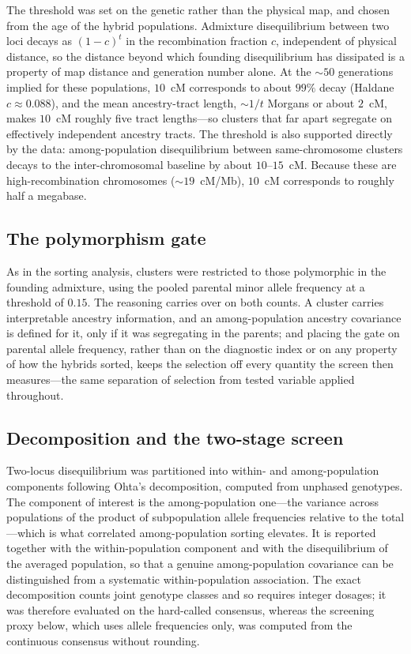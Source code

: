 \documentclass[11pt]{article}
\begin{document}
The threshold was set on the genetic rather than the physical map, and chosen from
the age of the hybrid populations. Admixture disequilibrium between two loci decays
as $(1-c)^{t}$ in the recombination fraction $c$, independent of physical distance,
so the distance beyond which founding disequilibrium has dissipated is a property of
map distance and generation number alone. At the $\sim\!50$ generations implied for
these populations, $10$~cM corresponds to about $99\%$ decay (Haldane $c \approx
0.088$), and the mean ancestry-tract length, $\sim\!1/t$ Morgans or about $2$~cM,
makes $10$~cM roughly five tract lengths---so clusters that far apart segregate on
effectively independent ancestry tracts. The threshold is also supported directly by
the data: among-population disequilibrium between same-chromosome clusters decays to
the inter-chromosomal baseline by about $10$--$15$~cM. Because these are
high-recombination chromosomes ($\sim\!19$~cM/Mb), $10$~cM corresponds to roughly
half a megabase.

\subsection{The polymorphism gate}
As in the sorting analysis, clusters were restricted to those polymorphic in the
founding admixture, using the pooled parental minor allele frequency at a threshold
of $0.15$. The reasoning carries over on both counts. A cluster carries
interpretable ancestry information, and an among-population ancestry covariance is
defined for it, only if it was segregating in the parents; and placing the gate on
parental allele frequency, rather than on the diagnostic index or on any property
of how the hybrids sorted, keeps the selection off every quantity the screen then
measures---the same separation of selection from tested variable applied throughout.

\subsection{Decomposition and the two-stage screen}
Two-locus disequilibrium was partitioned into within- and among-population
components following Ohta's decomposition, computed from unphased genotypes. The
component of interest is the among-population one---the variance across populations
of the product of subpopulation allele frequencies relative to the total---which is
what correlated among-population sorting elevates. It is reported together with the
within-population component and with the disequilibrium of the averaged population,
so that a genuine among-population covariance can be distinguished from a systematic
within-population association. The exact decomposition counts joint genotype classes
and so requires integer dosages; it was therefore evaluated on the hard-called
consensus, whereas the screening proxy below, which uses allele frequencies only,
was computed from the continuous consensus without rounding.
\end{document}
